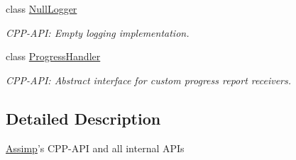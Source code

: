 \begin{DoxyCompactItemize}
class \hyperlink{classAssimp_1_1NullLogger}{\-Null\-Logger}
\begin{DoxyCompactList}\small\item\em \-C\-P\-P-\/\-A\-P\-I\-: \-Empty logging implementation. \end{DoxyCompactList}\item 
class \hyperlink{classAssimp_1_1ProgressHandler}{\-Progress\-Handler}
\begin{DoxyCompactList}\small\item\em \-C\-P\-P-\/\-A\-P\-I\-: \-Abstract interface for custom progress report receivers. \end{DoxyCompactList}\end{DoxyCompactItemize}


\subsection{\-Detailed \-Description}
\hyperlink{namespaceAssimp}{\-Assimp}'s \-C\-P\-P-\/\-A\-P\-I and all internal \-A\-P\-Is 